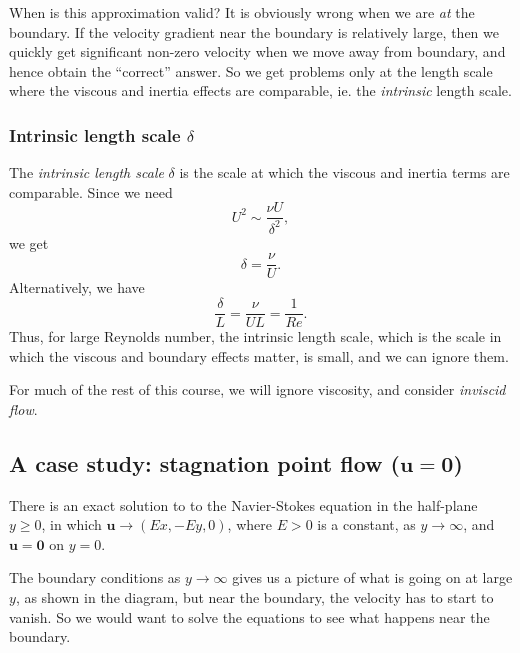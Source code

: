 \documentclass[a4paper]{article}
\begin{document}
When is this approximation valid? It is obviously wrong when we are \emph{at} the boundary. If the velocity gradient near the boundary is relatively large, then we quickly get significant non-zero velocity when we move away from boundary, and hence obtain the ``correct'' answer. So we get problems only at the length scale where the viscous and inertia effects are comparable, ie. the \emph{intrinsic} length scale.

\subsubsection{Intrinsic length scale \texorpdfstring{$\delta$}{delta}}
The \emph{intrinsic length scale} $\delta$ is the scale at which the viscous and inertia terms are comparable. Since we need
\[
  U^2 \sim \frac{\nu U}{\delta^2},
\]
we get
\[
  \delta = \frac{\nu}{U}.
\]
Alternatively, we have
\[
  \frac{\delta}{L} = \frac{\nu}{UL} = \frac{1}{Re}.
\]
Thus, for large Reynolds number, the intrinsic length scale, which is the scale in which the viscous and boundary effects matter, is small, and we can ignore them.

For much of the rest of this course, we will ignore viscosity, and consider \emph{inviscid flow}.
\subsection{A case study: stagnation point flow (\texorpdfstring{$\mathbf{u} = \mathbf{0}$}{u = 0})}
There is an exact solution to to the Navier-Stokes equation in the half-plane $y \geq 0$, in which $\mathbf{u} \to (Ex, -E y, 0)$, where $E > 0$ is a constant, as $y \to \infty$, and $\mathbf{u} = \mathbf{0}$ on $y = 0$.
\begin{center}
\end{center}
The boundary conditions as $y \to \infty$ gives us a picture of what is going on at large $y$, as shown in the diagram, but near the boundary, the velocity has to start to vanish. So we would want to solve the equations to see what happens near the boundary.
\end{document}
